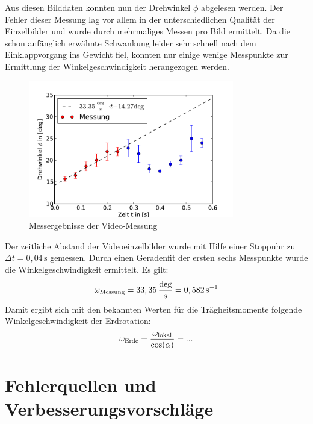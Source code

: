 \documentclass[11pt]{scrartcl}
\newcommand{\unit}[1]{\ensuremath{\,\mathrm{#1}}} %
\newcommand{\ltext}[1]{\ensuremath{_{\textnormal{#1}}}}
\begin{document}
Aus diesen Bilddaten konnten nun der Drehwinkel $\phi$ abgelesen werden. Der Fehler dieser Messung lag vor allem in der unterschiedlichen Qualität der Einzelbilder und wurde durch mehrmaliges Messen pro Bild ermittelt.
Da die schon anfänglich erwähnte Schwankung leider sehr schnell nach dem Einklappvorgang ins Gewicht fiel, konnten nur einige wenige Messpunkte zur Ermittlung der Winkelgeschwindigkeit herangezogen werden.
\begin{figure}[h]
\begin{center}
\includegraphics[width=0.8\textwidth]{messung_Video.pdf}
\end{center}
\vspace{-1.5\baselineskip}
\caption{Messergebnisse der Video-Messung}
\label{messung_Video}
\end{figure}
Der zeitliche Abstand der Videoeinzelbilder wurde mit Hilfe einer Stoppuhr zu $\Delta t = 0,04\unit{s}$ gemessen.
Durch einen Geradenfit der ersten sechs Messpunkte wurde die Winkelgeschwindigkeit ermittelt. Es gilt:
\begin{equation}
\omega\ltext{Messung} = 33,35 \unit{\frac{deg}{s}} = 0,582 \unit{s^{-1}}
\end{equation}
Damit ergibt sich mit den bekannten Werten für die Trägheitsmomente folgende Winkelgeschwindigkeit der Erdrotation:
\begin{equation}
\omega\ltext{Erde} = \frac{\omega\ltext{lokal}}{\cos(\alpha)} = ...
\end{equation}



\FloatBarrier
\section{Fehlerquellen und Verbesserungsvorschläge}\label{sec:verbesserung}
\end{document}
